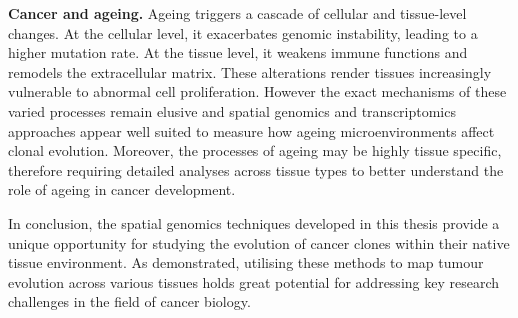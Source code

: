 \textbf{Cancer and ageing.} Ageing triggers a cascade of cellular and tissue-level changes. At the cellular level, it exacerbates genomic instability, leading to a higher mutation rate. At the tissue level, it weakens immune functions and remodels the extracellular matrix. These alterations render tissues increasingly vulnerable to abnormal cell proliferation. However the exact mechanisms of these varied processes remain elusive and spatial genomics and transcriptomics approaches appear well suited to measure how ageing microenvironments affect clonal evolution. Moreover, the processes of ageing may be highly tissue specific, therefore requiring detailed analyses across tissue types to better understand the role of ageing in cancer development.

In conclusion, the spatial genomics techniques developed in this thesis provide a unique opportunity for studying the evolution of cancer clones within their native tissue environment. As demonstrated, utilising these methods to map tumour evolution across various tissues holds great potential for addressing key research challenges in the field of cancer biology.